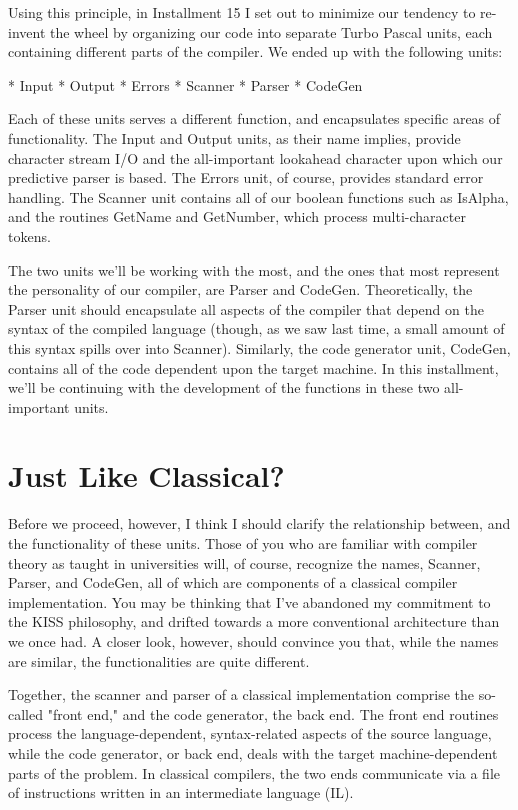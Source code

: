 \documentclass[float=false, crop=false]{standalone}
\begin{document}
Using this principle, in Installment 15 I set out to minimize our tendency to
re-invent the wheel by organizing our code into separate Turbo Pascal units,
each containing different parts of the compiler. We ended up with the following
units:

*	Input
*	Output
*	Errors
*	Scanner
*	Parser
*	CodeGen

Each of these units serves a different function, and encapsulates specific areas
of functionality. The Input and Output units, as their name implies, provide
character stream I/O and the all-important lookahead character upon which our
predictive parser is based. The Errors unit, of course, provides standard error
handling. The Scanner unit contains all of our boolean functions such as
IsAlpha, and the routines GetName and GetNumber, which process multi-character
tokens.

The two units we'll be working with the most, and the ones that most represent
the personality of our compiler, are Parser and CodeGen. Theoretically, the
Parser unit should encapsulate all aspects of the compiler that depend on the
syntax of the compiled language (though, as we saw last time, a small amount of
this syntax spills over into Scanner). Similarly, the code generator unit,
CodeGen, contains all of the code dependent upon the target machine. In this
installment, we'll be continuing with the development of the functions in these
two all- important units.


\section{Just Like Classical?}

Before we proceed, however, I think I should clarify the relationship between,
and the functionality of these units. Those of you who are familiar with
compiler theory as taught in universities will, of course, recognize the names,
Scanner, Parser, and CodeGen, all of which are components of a classical
compiler implementation. You may be thinking that I've abandoned my commitment
to the KISS philosophy, and drifted towards a more conventional architecture
than we once had. A closer look, however, should convince you that, while the
names are similar, the functionalities are quite different.

Together, the scanner and parser of a classical implementation comprise the
so-called "front end," and the code generator, the back end. The front end
routines process the language-dependent, syntax-related aspects of the source
language, while the code generator, or back end, deals with the target
machine-dependent parts of the problem. In classical compilers, the two ends
communicate via a file of instructions written in an intermediate language (IL).
\end{document}
